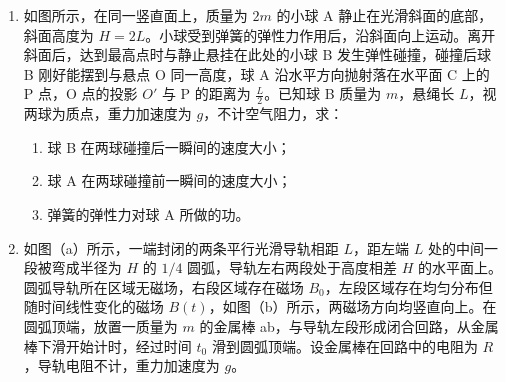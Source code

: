 \documentclass[\gkver]{gaokaozhenti}
\begin{document}
\begin{enumerate}
\item
如图所示，在同一竖直面上，质量为 $2m$ 的小球 A 静止在光滑斜面的底部，斜面高度为 $H=2L$。小球受到弹簧的弹性力作用后，沿斜面向上运动。离开斜面后，达到最高点时与静止悬挂在此处的小球 B 发生弹性碰撞，碰撞后球 B 刚好能摆到与悬点 O 同一高度，球 A 沿水平方向抛射落在水平面 C 上的 P 点，O 点的投影 $O'$ 与 P 的距离为 $\frac{L}{2}$。已知球 B 质量为 $m$，悬绳长 $L$，视两球为质点，重力加速度为 $g$，不计空气阻力，求：

\begin{enumerate}
	\item
	球 B 在两球碰撞后一瞬间的速度大小；
	\item
	球 A 在两球碰撞前一瞬间的速度大小；
	\item
	弹簧的弹性力对球 A 所做的功。
\end{enumerate}




\item
如图（a）所示，一端封闭的两条平行光滑导轨相距 $L$，距左端 $L$ 处的中间一段被弯成半径为 $H$ 的 $1/4$ 圆弧，导轨左右两段处于高度相差 $H$ 的水平面上。圆弧导轨所在区域无磁场，右段区域存在磁场 $B_{0}$，左段区域存在均匀分布但随时间线性变化的磁场 $B(t)$，如图（b）所示，两磁场方向均竖直向上。在圆弧顶端，放置一质量为 $m$ 的金属棒 ab，与导轨左段形成闭合回路，从金属棒下滑开始计时，经过时间 $t_{0}$ 滑到圆弧顶端。设金属棒在回路中的电阻为 $R$，导轨电阻不计，重力加速度为 $g$。


\end{enumerate}
\end{document}
